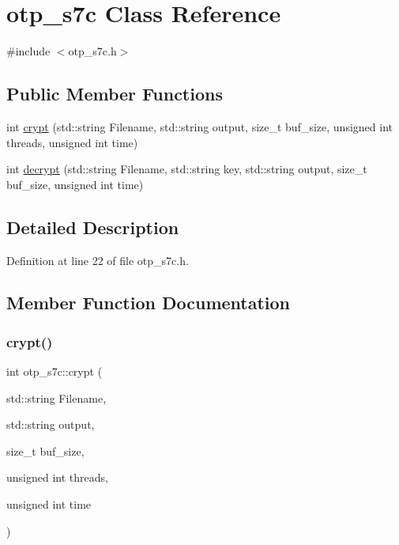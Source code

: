 \hypertarget{classotp__s7c}{}\section{otp\+\_\+s7c Class Reference}
\label{classotp__s7c}


{\ttfamily \#include $<$otp\+\_\+s7c.\+h$>$}

\subsection*{Public Member Functions}
\begin{DoxyCompactItemize}
\item 
int \mbox{\hyperlink{classotp__s7c_a0a44785b6625d14e143b618e678b8fa6}{crypt}} (std\+::string Filename, std\+::string output, size\+\_\+t buf\+\_\+size, unsigned int threads, unsigned int time)
\item 
int \mbox{\hyperlink{classotp__s7c_ae97c0aad52d688f1aff95fa6c7d7d743}{decrypt}} (std\+::string Filename, std\+::string key, std\+::string output, size\+\_\+t buf\+\_\+size, unsigned int time)
\end{DoxyCompactItemize}


\subsection{Detailed Description}


Definition at line 22 of file otp\+\_\+s7c.\+h.



\subsection{Member Function Documentation}
\mbox{\label{classotp__s7c_a0a44785b6625d14e143b618e678b8fa6}} 
\subsubsection{\texorpdfstring{crypt()}{crypt()}}
{\footnotesize\ttfamily int otp\+\_\+s7c\+::crypt (\begin{DoxyParamCaption}\item[{std\+::string}]{Filename,  }\item[{std\+::string}]{output,  }\item[{size\+\_\+t}]{buf\+\_\+size,  }\item[{unsigned int}]{threads,  }\item[{unsigned int}]{time }\end{DoxyParamCaption})}

